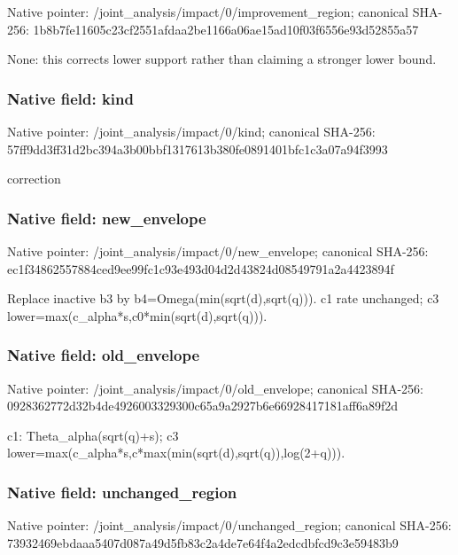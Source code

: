 \documentclass[10pt,a4paper]{article}
\begin{document}
Native pointer: /joint\_analysis/impact/0\allowbreak{}/improvement\_region; canonical SHA-256: 1b8b7fe11605c23cf2551afd\allowbreak{}aa2be1166a06ae15ad10f03f\allowbreak{}6556e93d52855a57


None: this corrects lower support rather than claiming a stronger lower bound.


\subsubsection{Native field: kind}


Native pointer: /joint\_analysis/impact/0/kind; canonical SHA-256: 57ff9dd3ff31d2bc394a3b00\allowbreak{}bbf1317613b380fe0891401b\allowbreak{}fc1c3a07a94f3993


correction


\subsubsection{Native field: new\_envelope}


Native pointer: /joint\_analysis/impact/0/new\_envelope; canonical SHA-256: ec1f34862557884ced9ee99f\allowbreak{}c1c93e493d04d2d43824d085\allowbreak{}49791a2a4423894f


Replace inactive b3 by b4=Omega(min(sqrt(d),sqrt(q))). c1 rate unchanged; c3 lower=max(c\_alpha*s,c0*m\allowbreak{}in(sqrt(d),sqrt(q))).


\subsubsection{Native field: old\_envelope}


Native pointer: /joint\_analysis/impact/0/old\_envelope; canonical SHA-256: 0928362772d32b4de4926003\allowbreak{}329300c65a9a2927b6e66928\allowbreak{}417181aff6a89f2d


c1: Theta\_alpha(sqrt(q)+s); c3 lower=max(c\_alpha*s,c*ma\allowbreak{}x(min(sqrt(d),sqrt(q)),l\allowbreak{}og(2+q))).


\subsubsection{Native field: unchanged\_region}


Native pointer: /joint\_analysis/impact/0\allowbreak{}/unchanged\_region; canonical SHA-256: 73932469ebdaaa5407d087a4\allowbreak{}9d5fb83c2a4de7e64f4a2edc\allowbreak{}dbfcd9c3e59483b9
\end{document}
